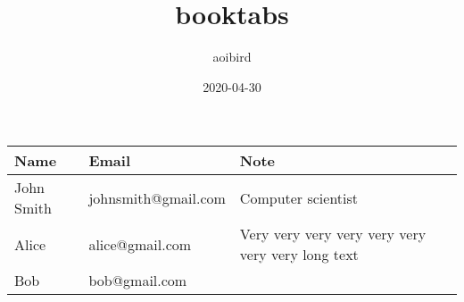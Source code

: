 \documentclass{article}
\title{booktabs}
\author{aoibird}
\date{2020-04-30}
\begin{document}
\maketitle

\begin{tabularx}{\textwidth}{|l|l|X|}
  \hline
  Name & Email & Note \\
  \hline
  John Smith & johnsmith@gmail.com & Computer scientist \\
  \hline
  Alice & alice@gmail.com & Very very very very very very very very long text\\
  \hline
  Bob & bob@gmail.com & \\
  \hline
\end{tabularx}
\end{document}

